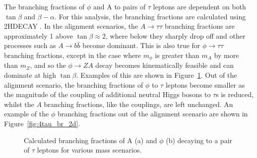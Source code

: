 The branching fractions of $\phi$ and A to pairs of $\tau$ leptons are dependent on both $\tan\beta$ and $\beta-\alpha$.
For this analysis, the branching fractions are calculated using \textsc{2HDECAY} \cite{Krause:2018wmo}.
In the alignment scenarios, the $A\rightarrow\tau\tau$ branching fractions are approximately 1 above $\tan\beta \approx 2$, where below they sharply drop off and other processes such as $A\rightarrow b\bar{b}$ become dominant.
This is also true for $\phi\rightarrow\tau\tau$ branching fractions, except in the case where $m_\phi$ is greater than $m_A$ by more than $m_Z$, and so the $\phi\rightarrow ZA$ decay becomes kinematically feasible and can dominate at high $\tan\beta$.
Examples of this are shown in Figure~\ref{fig:4tau_br_1d}.
Out of the alignment scenario, the branching fractions of $\phi$ to $\tau$ leptons become smaller as the magnitude of the coupling of additional neutral Higgs bosons to $\tau$s is reduced, whilst the $A$ branching fractions, like the couplings, are left unchanged.
An example of the $\phi$ branching fractions out of the alignment scenario are shown in Figure~\ref{fig:4tau_br_2d}.

\begin{figure}[!hbtp]
\centering
\caption{Calculated branching fractions of A (a) and $\phi$ (b) decaying to a pair of $\tau$ leptons for various mass scenarios.}
\label{fig:4tau_br_1d}
\end{figure}

